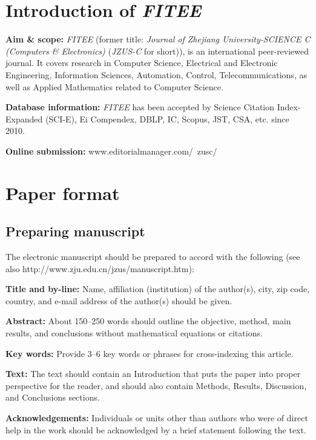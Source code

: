 \documentclass[twoside,twocolumn]{article}
\begin{document}
\section{Introduction of \emph{FITEE}}

\noindent \textbf{Aim \& scope:} \emph{FITEE} (former title: \emph{Journal of Zhejiang University-SCIENCE C (Computers {\sf \slshape \&} Electronics)} (\emph{JZUS-C} for short)), is an international peer-reviewed journal. It covers research in Computer Science, Electrical and Electronic Engineering, Information Sciences, Automation, Control, Telecommunications, as well as Applied Mathematics related to Computer Science.

\noindent \textbf{Database information:} \emph{FITEE} has been accepted by Science Citation Index-Expanded (SCI-E), Ei Compendex, DBLP, IC, Scopus, JST, CSA, etc. since 2010.




\noindent \textbf{Online submission:} www.editorialmanager.com/\ zusc/

\section{Paper format}

\subsection{Preparing manuscript}

The electronic manuscript should be prepared to accord with the following (see also http://www.zju.edu.cn/jzus/manuscript.htm):

\noindent \textbf{Title and by-line:} Name, affiliation (institution) of the author(s), city, zip code, country, and e-mail address of the author(s) should be given.

\noindent \textbf{Abstract:} About 150--250 words should outline the objective, method, main results, and conclusions without mathematical equations or citations.

\noindent \textbf{Key words:} Provide 3--6 key words or phrases for cross-indexing this article.

\noindent \textbf{Text:} The text should contain an Introduction that puts the paper into proper perspective for the reader, and should also contain Methods, Results, Discussion, and Conclusions sections.

\noindent \textbf{Acknowledgements:} Individuals or units other than authors who were of direct help in the work should be acknowledged by a brief statement following the text.
\end{document}
